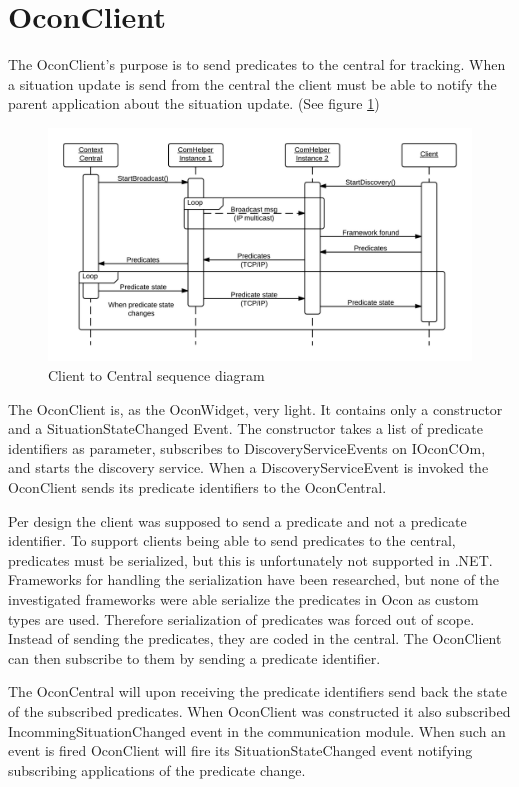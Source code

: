 \documentclass[../report.tex]{subfiles}
\begin{document}
\section{OconClient}
The OconClient's purpose is to send predicates to the central for tracking. When a situation update is send from the central the client must be able to notify the parent application about the situation update. (See figure \ref{fig:clientComHelper})

\begin{figure}[H]
\hspace{-35px}
\includegraphics[width=500px]{comHelperSequence-client.png}
\caption{Client to Central sequence diagram}
\label{fig:clientComHelper}
\end{figure}

The OconClient is, as the OconWidget, very light. It contains only a constructor and a SituationStateChanged Event. The constructor takes a list of predicate identifiers as parameter, subscribes to DiscoveryServiceEvents on IOconCOm, and starts the discovery service. When a DiscoveryServiceEvent is invoked the OconClient sends its predicate identifiers to the OconCentral.

Per design the client was supposed to send a predicate and not a predicate identifier. To support clients being able to send predicates to the central, predicates must be serialized, but this is unfortunately not supported in .NET. Frameworks for handling the serialization have been researched, but none of the investigated frameworks were able serialize the predicates in Ocon as custom types are used. Therefore serialization of predicates was forced out of scope. Instead of sending the predicates, they are coded in the central. The OconClient can then subscribe to them by sending a predicate identifier. 

The OconCentral will upon receiving the predicate identifiers send back the state of the subscribed predicates. When OconClient was constructed it also subscribed IncommingSituationChanged event in the communication module. When such an event is fired OconClient will fire its SituationStateChanged event notifying subscribing applications of the predicate change.
\end{document}
